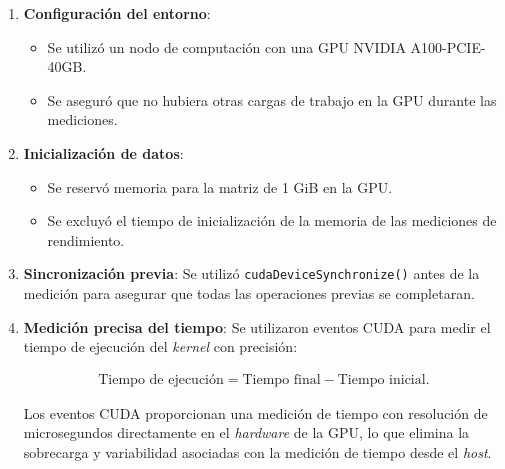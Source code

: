         \begin{enumerate}
        
            \item \textbf{Configuración del entorno}:
            
                \begin{itemize}
                
                    \item Se utilizó un nodo de computación con una GPU NVIDIA A100-PCIE-40GB.
                    
                    \item Se aseguró que no hubiera otras cargas de trabajo en la GPU durante las mediciones.
                    
                \end{itemize}
            
            \item \textbf{Inicialización de datos}:
            
                \begin{itemize}
                
                    \item Se reservó memoria para la matriz de 1 GiB en la GPU.
                    
                    \item Se excluyó el tiempo de inicialización de la memoria de las mediciones de rendimiento.
                    
                \end{itemize}
            
            \item \textbf{Sincronización previa}: Se utilizó \texttt{cudaDeviceSynchronize()} antes de la medición para asegurar que todas las operaciones previas se completaran.
            
            \item \textbf{Medición precisa del tiempo}: Se utilizaron eventos CUDA para medir el tiempo de ejecución del \textit{kernel} con precisión:
                
                \begin{align*}
                    \text{Tiempo de ejecución} = \text{Tiempo final} - \text{Tiempo inicial}.
                \end{align*}
                
                Los eventos CUDA proporcionan una medición de tiempo con resolución de microsegundos directamente en el \textit{hardware} de la GPU, lo que elimina la sobrecarga y variabilidad asociadas con la medición de tiempo desde el \textit{host}.
            

\end{enumerate}
